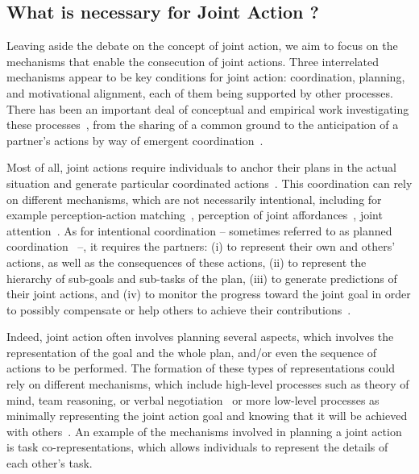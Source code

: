 \documentclass[a4paper,11pt,twoside]{StyleThese}
\begin{document}
\subsection{What is necessary for Joint Action ?}

Leaving aside the debate on the concept of joint action, we aim to focus on the mechanisms that enable the consecution of joint actions. Three interrelated mechanisms appear to be key conditions for joint action: coordination, planning, and motivational alignment, each of them being supported by other processes. There has been an important deal of conceptual and empirical work investigating these processes~\cite{knoblich_2011_joint, pacherie_2012_agency}, from the sharing of a common ground to the anticipation of a partner’s actions by way of emergent coordination~\cite{curioni_2019_joint}. 

Most of all, joint actions require individuals to anchor their plans in the actual situation and generate particular coordinated actions~\cite{knoblich_2011_joint, vesper_2011_making}. This coordination can rely on different mechanisms, which are not necessarily intentional, including for example perception-action matching~\cite{brass_2001_movement}, perception of joint affordances~\cite{ramenzoni_2008_short}, joint attention~\cite{sebanz_2006_joint}. As for intentional coordination – sometimes referred to as planned coordination~\cite{curioni_2019_joint} –, it requires the partners: (i) to represent their own and others' actions, as well as the consequences of these actions, (ii) to represent the hierarchy of sub-goals and sub-tasks of the plan, (iii) to generate predictions of their joint actions, and (iv) to monitor the progress toward the joint goal in order to possibly compensate or help others to achieve their contributions~\cite{pacherie_2012_agency}.

Indeed, joint action often involves planning several aspects, which involves the representation of the goal and the whole plan, and/or even the sequence of actions to be performed. The formation of these types of representations could rely on different mechanisms, which include high-level processes such as theory of mind, team reasoning, or verbal negotiation~\cite{bratman_2013_shared} or more low-level processes as minimally representing the joint action goal and knowing that it will be achieved with others~\cite{vesper_2010_minimal}. An example of the mechanisms involved in planning a joint action is task co-representations, which allows individuals to represent the details of each other’s task. 
\end{document}
